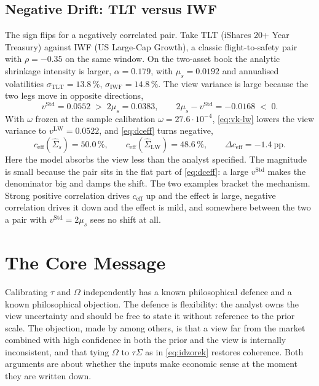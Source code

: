\documentclass[a4paper,11pt]{article}
\theoremstyle{plain}
\theoremstyle{definition}
\newcommand{\Std}{\mathrm{Std}}
\newcommand{\LW}{\mathrm{LW}}
\newcommand{\eff}{\mathrm{eff}}
\begin{document}
\subsection{Negative Drift: TLT versus IWF}
\label{sec:neg}

The sign flips for a negatively correlated pair. Take TLT (iShares 20+ Year
Treasury) against IWF (US Large-Cap Growth), a classic flight-to-safety pair with
$\rho = -0.35$ on the same window. On the two-asset book the analytic shrinkage
intensity is larger, $\alpha = 0.179$, with $\mu_s = 0.0192$ and annualised
volatilities $\sigma_{\mathrm{TLT}} = 13.8\,\%$, $\sigma_{\mathrm{IWF}} = 14.8\,\%$.
The view variance is large because the two legs move in opposite directions,
\[
  v^\Std = 0.0552 \;>\; 2\mu_s = 0.0383,
  \qquad 2\mu_s - v^\Std = -0.0168 \;<\; 0 .
\]
With $\omega$ frozen at the sample calibration $\omega = 27.6 \cdot 10^{-4}$,
\eqref{eq:vk-lw} lowers the view variance to $v^\LW = 0.0522$, and \eqref{eq:dceff}
turns negative,
\[
  c_{\eff}(\hat\Sigma_s) = 50.0\,\%,
  \qquad c_{\eff}(\hat\Sigma_{\LW}) = 48.6\,\%,
  \qquad \Delta c_{\eff} = -1.4\ \text{pp} .
\]
Here the model absorbs the view less than the analyst specified. The magnitude is
small because the pair sits in the flat part of \eqref{eq:dceff}: a large $v^\Std$
makes the denominator big and damps the shift. The two examples bracket the
mechanism. Strong positive correlation drives $c_{\eff}$ up and the effect is
large, negative correlation drives it down and the effect is mild, and somewhere
between the two a pair with $v^\Std = 2\mu_s$ sees no shift at all.

\section{The Core Message}
\label{sec:core}

Calibrating $\tau$ and $\Omega$ independently has a known philosophical defence
and a known philosophical objection. The defence is flexibility: the analyst owns
the view uncertainty and should be free to state it without reference to the prior
scale. The objection, made by \citet{Meucci2006} among others, is that a view far
from the market combined with high confidence in both the prior and the view is
internally inconsistent, and that tying $\Omega$ to $\tau\Sigma$ as in
\eqref{eq:idzorek} restores coherence. Both arguments are about whether the inputs
make economic sense at the moment they are written down.
\end{document}
